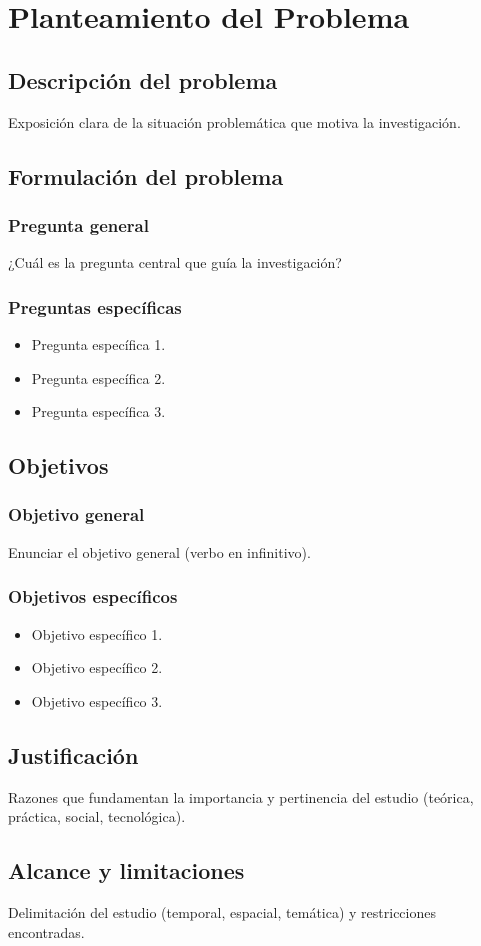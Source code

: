 \chapter{Planteamiento del Problema}
\label{cap:problema}

\section{Descripción del problema}

Exposición clara de la situación problemática que motiva la investigación.

\section{Formulación del problema}

\subsection{Pregunta general}
¿Cuál es la pregunta central que guía la investigación?

\subsection{Preguntas específicas}
\begin{itemize}
  \item Pregunta específica 1.
  \item Pregunta específica 2.
  \item Pregunta específica 3.
\end{itemize}

\section{Objetivos}

\subsection{Objetivo general}
Enunciar el objetivo general (verbo en infinitivo).

\subsection{Objetivos específicos}
\begin{itemize}
  \item Objetivo específico 1.
  \item Objetivo específico 2.
  \item Objetivo específico 3.
\end{itemize}

\section{Justificación}

Razones que fundamentan la importancia y pertinencia del estudio (teórica,
práctica, social, tecnológica).

\section{Alcance y limitaciones}

Delimitación del estudio (temporal, espacial, temática) y restricciones
encontradas.
